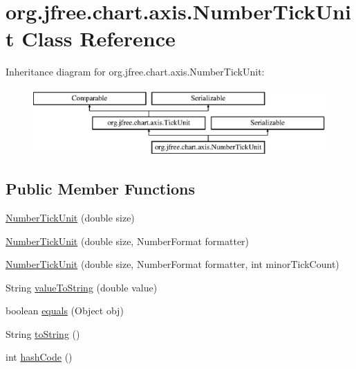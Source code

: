 \hypertarget{classorg_1_1jfree_1_1chart_1_1axis_1_1_number_tick_unit}{}\section{org.\+jfree.\+chart.\+axis.\+Number\+Tick\+Unit Class Reference}
\label{classorg_1_1jfree_1_1chart_1_1axis_1_1_number_tick_unit}
Inheritance diagram for org.\+jfree.\+chart.\+axis.\+Number\+Tick\+Unit\+:\begin{figure}[H]
\begin{center}
\leavevmode
\includegraphics[height=2.545455cm]{classorg_1_1jfree_1_1chart_1_1axis_1_1_number_tick_unit}
\end{center}
\end{figure}
\subsection*{Public Member Functions}
\begin{DoxyCompactItemize}
\item 
\mbox{\hyperlink{classorg_1_1jfree_1_1chart_1_1axis_1_1_number_tick_unit_aac66852fc79c9252d3b8d97a8abe14e5}{Number\+Tick\+Unit}} (double size)
\item 
\mbox{\hyperlink{classorg_1_1jfree_1_1chart_1_1axis_1_1_number_tick_unit_a7d5d8379a5a61ffac6833e40f769542b}{Number\+Tick\+Unit}} (double size, Number\+Format formatter)
\item 
\mbox{\hyperlink{classorg_1_1jfree_1_1chart_1_1axis_1_1_number_tick_unit_a96dfae0ecda38772a98d9dda93cdc7e8}{Number\+Tick\+Unit}} (double size, Number\+Format formatter, int minor\+Tick\+Count)
\item 
String \mbox{\hyperlink{classorg_1_1jfree_1_1chart_1_1axis_1_1_number_tick_unit_ad9f7529de2d9e870d533ed5746d65079}{value\+To\+String}} (double value)
\item 
boolean \mbox{\hyperlink{classorg_1_1jfree_1_1chart_1_1axis_1_1_number_tick_unit_af0e0d8af1ae9028019a0e49fb4513d2e}{equals}} (Object obj)
\item 
String \mbox{\hyperlink{classorg_1_1jfree_1_1chart_1_1axis_1_1_number_tick_unit_a7ac046ae8c0346f54b309c05fb99c82f}{to\+String}} ()
\item 
int \mbox{\hyperlink{classorg_1_1jfree_1_1chart_1_1axis_1_1_number_tick_unit_aaed60906ec9dd8fe843cdf042e3da79d}{hash\+Code}} ()
\end{DoxyCompactItemize}


